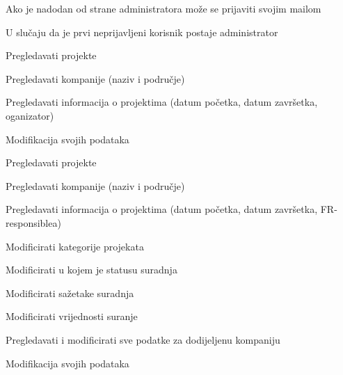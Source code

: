 			
			\begin{packed_enum}
				\item  {}

				\begin{packed_enum}

					\item Ako je nadodan od strane administratora može se prijaviti svojim mailom
					\item U slučaju da je prvi neprijavljeni korisnik postaje administrator

				\end{packed_enum}

				\item  {}
				
				\begin{packed_enum}
					
					\item Pregledavati projekte
					\item Pregledavati kompanije (naziv i područje)
					\item Pregledavati informacija o projektima (datum početka, datum završetka, oganizator)
					\item Modifikacija svojih podataka
					
				\end{packed_enum}

				\item  {}

				\begin{packed_enum}

					\item Pregledavati projekte
					\item Pregledavati kompanije (naziv i područje)
					\item Pregledavati informacija o projektima (datum početka, datum završetka, FR-responsiblea)
					\item Modificirati kategorije projekata
					\item Modificirati u kojem je statusu suradnja
					\item Modificirati sažetake suradnja
					\item Modificirati vrijednosti suranje
					\item Pregledavati i modificirati sve podatke za dodijeljenu kompaniju
					\item Modifikacija svojih podataka


\end{packed_enum}
\end{packed_enum}
